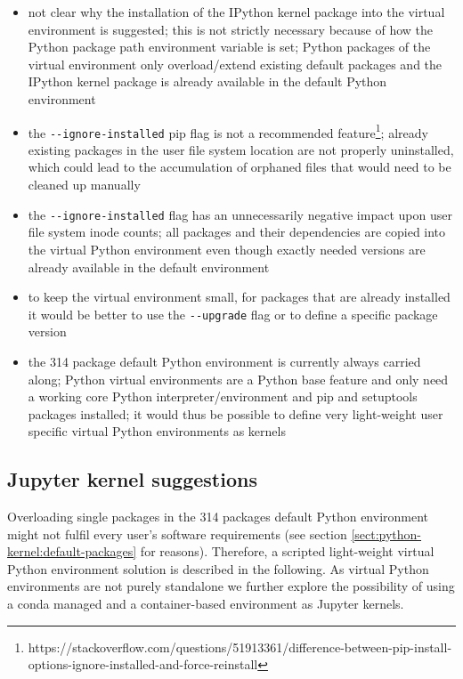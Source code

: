\documentclass[11pt,a4paper]{article}
\begin{document}
\begin{itemize}

\item not clear why the installation of the IPython kernel package into the virtual environment is suggested;
this is not strictly necessary because of how the Python package path environment variable is set;
Python packages of the virtual environment only overload/extend existing default packages and the IPython kernel package is already available in the default Python environment

\item the \verb|--ignore-installed| pip flag is not a recommended feature\footnote{https://stackoverflow.com/questions/51913361/difference-between-pip-install-options-ignore-installed-and-force-reinstall};
already existing packages in the user file system location are not properly uninstalled, which could lead to the accumulation of orphaned files that would need to be cleaned up manually

\item the \verb|--ignore-installed| flag has an unnecessarily negative impact upon user file system inode counts;
all packages and their dependencies are copied into the virtual Python environment even though exactly needed versions are already available in the default environment

\item to keep the virtual environment small, for packages that are already installed it would be better to use the \verb|--upgrade| flag or to define a specific package version

\item the 314 package default Python environment is currently always carried along;
Python virtual environments are a Python base feature and only need a working core Python interpreter/environment and pip and setuptools packages installed;
it would thus be possible to define very light-weight user specific virtual Python environments as kernels

\end{itemize}

\subsection{Jupyter kernel suggestions}
\label{sect:jupyter-kernel-suggestions}

Overloading single packages in the 314 packages default Python environment might not fulfil every user's software requirements (see section \ref{sect:python-kernel:default-packages} for reasons).
Therefore, a scripted light-weight virtual Python environment solution is described in the following.
As virtual Python environments are not purely standalone we further explore the possibility of using a conda managed and a container-based environment as Jupyter kernels.
\end{document}
